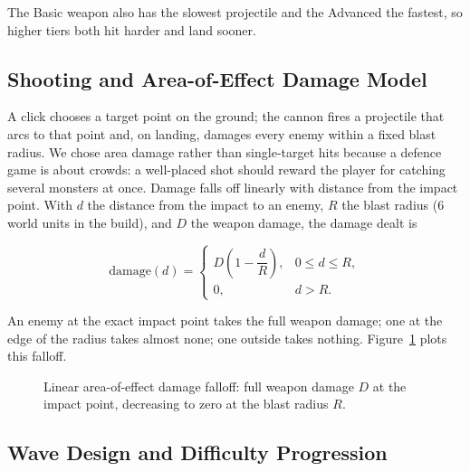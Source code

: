 \documentclass[12pt,a4paper]{report}
\begin{document}
The Basic weapon also has the slowest projectile and the Advanced the fastest,
so higher tiers both hit harder and land sooner.

\subsection{Shooting and Area-of-Effect Damage Model}

A click chooses a target point on the ground; the cannon fires a projectile that
arcs to that point and, on landing, damages every enemy within a fixed blast
radius. We chose area damage rather than single-target hits because a defence
game is about crowds: a well-placed shot should reward the player for catching
several monsters at once. Damage falls off linearly with distance from the
impact point. With $d$ the distance from the impact to an enemy, $R$ the blast
radius (6 world units in the build), and $D$ the weapon damage, the damage dealt
is

\begin{equation}
\text{damage}(d) =
\begin{cases}
D\left(1 - \dfrac{d}{R}\right), & 0 \le d \le R, \\[2mm]
0, & d > R.
\end{cases}
\end{equation}

An enemy at the exact impact point takes the full weapon damage; one at the edge
of the radius takes almost none; one outside takes nothing.
Figure~\ref{fig:falloff} plots this falloff.

\begin{figure}[htbp]
\centering
{}
\caption{Linear area-of-effect damage falloff: full weapon damage $D$ at the
impact point, decreasing to zero at the blast radius $R$.}
\label{fig:falloff}
\end{figure}

\subsection{Wave Design and Difficulty Progression}
\end{document}
